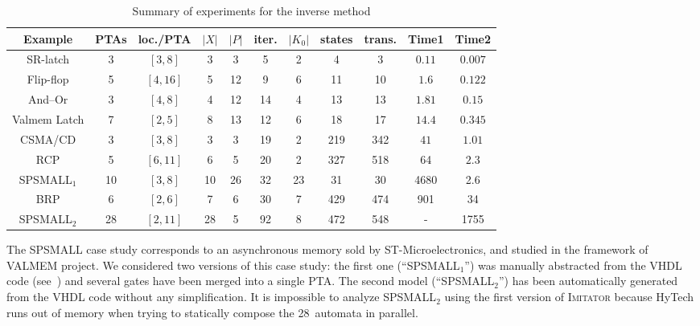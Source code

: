 \documentclass[submission,copyright,creativecommons]{eptcs}
\newcommand{\hytech}{{\sc HyTech}}
\newcommand{\imitator}{\textsc{Imitator}}
\begin{document}
\begin{table}[ht!]

\centering

\small

\begin{tabular}{|@{\,}c@{\,}||@{\,}c@{\,}|@{\,}c@{\,}|@{\,}c@{\,}|@{\,}c@{\,}||@{\,}c@{\,}|@{\,}c@{\,}|@{\,}c@{\,}|@{\,}c@{\,}||@{\,}c@{\,}|@{\,}c@{\,}|}
\hline
	Example & PTAs & loc./PTA &$|X|$ & $|P|$ & iter. & $|K_0|$ & states & trans. & Time1 & Time2 \\
\hline
	SR-latch & 3 & $[3, 8]$ & 3 & 3 & 5 & 2 & 4 & 3 & $0.11$ & $0.007$ \\
\hline
	Flip-flop \cite{cc07} & 5 & $[4, 16]$ & 5 & 12 & 9 & 6 & 11 & 10 & $1.6$ & $0.122$ \\
\hline
	And--Or \cite{cc05} & 3 & $[4, 8]$ & 4 & 12 & 14 & 4 & 13 & 13 & $1.81$ & $0.15$ \\
\hline
	Valmem Latch & 7 & $[2, 5]$ & 8 & 13 & 12 & 6 & 18 & 17 & $14.4$ & $0.345$ \\
\hline
	CSMA/CD \cite{knsw07} & 3 & $[3, 8]$ & 3 & 3 & 19 & 2 & 219 & 342 & $41$ & $1.01$ \\
\hline
	RCP \cite{kns03} & 5 & $[6, 11]$ & 6 & 5 & 20 & 2 & 327 & 518 & 64 & $2.3$ \\
\hline
	SPSMALL$_1$ \cite{cefx09} & 10 & $[3, 8]$ & 10 & 26 & 32 & 23 & 31 & 30 & 4680 & 2.6 \\
\hline
	BRP \cite{dkrt97} & 6 & $[2, 6]$ & 7 & 6 & 30 & 7 & 429 & 474 & 901 & 34 \\
\hline
	SPSMALL$_2$ \cite{cefx09} & 28 & $[2, 11]$ & 28 & 5 & 92 & 8 & 472 & 548 & - & 1755 \\
\hline
\end{tabular}

\caption{Summary of experiments for the inverse method}
\label{table:experiments-IM}
\end{table}


The SPSMALL case study corresponds to an asynchronous memory sold by ST-Microelectronics, and studied in the framework of VALMEM project.
We considered two versions of this case study: the first one (``SPSMALL$_1$'') was manually abstracted from the VHDL code (see~\cite{cefx09}) and several gates have been merged into a single PTA.
The second model (``SPSMALL$_2$'') has been automatically generated from the VHDL code without any simplification.
It is impossible to analyze SPSMALL$_2$ using the first version of \imitator{} because \hytech{} runs out of memory when trying to statically compose the 28~automata in parallel.
\end{document}
